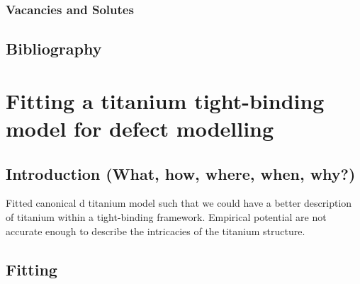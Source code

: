 \documentclass[a4paper,11pt]{article}
\numberwithin{equation}{chapter}
\numberwithin{listing}{chapter}
\begin{document}
\subsubsection{Vacancies and Solutes}
\label{sec:org3526230}


\subsection{Bibliography}
\label{sec:orgc0ead5f}
\label{org476e890}






\section[Creating a tight-binding model for pure titanium]{Fitting a titanium tight-binding model for defect modelling}
\label{sec:orga80737f}

\subsection{Introduction (What, how, where, when, why?)}
\label{sec:org6ef0439}
Fitted canonical d titanium model such that we could have a better
description of titanium within a tight-binding framework. Empirical
potential are not accurate enough to describe the intricacies of the
titanium structure.

\subsection{Fitting}
\label{sec:orge836f71}
\end{document}
